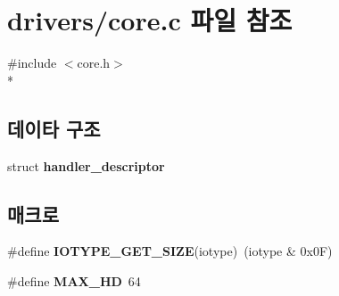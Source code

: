 \section{drivers/core.c 파일 참조}
\label{core_8c}
{\ttfamily \#include $<$core.\-h$>$}\\*
\subsection*{데이타 구조}
\begin{DoxyCompactItemize}
\item 
struct {\bf handler\-\_\-descriptor}
\end{DoxyCompactItemize}
\subsection*{매크로}
\begin{DoxyCompactItemize}
\item 
\#define {\bfseries I\-O\-T\-Y\-P\-E\-\_\-\-G\-E\-T\-\_\-\-S\-I\-Z\-E}(iotype)~(iotype \& 0x0\-F)\label{core_8c_aea418cbb2443f1abfd648364619c1347}

\item 
\#define {\bfseries M\-A\-X\-\_\-\-H\-D}~64\label{core_8c_a4f3fd33d1e0605d7f39a3b31eca805b7}

\end{DoxyCompactItemize}
